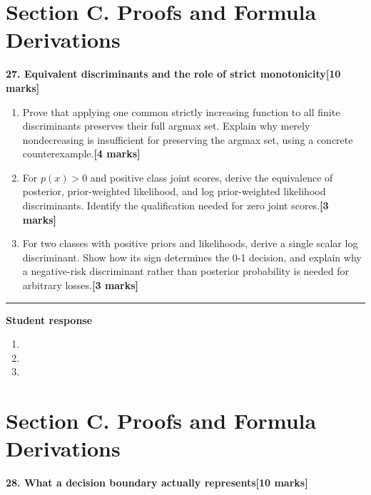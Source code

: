 \documentclass[11pt,a4paper]{article}
\newlength{\BlankAnswerHeight}\setlength{\BlankAnswerHeight}{16mm}
\newcommand{\AnswerBlank}{\leavevmode\par\vspace{\BlankAnswerHeight}}
\begin{document}
\newpage\section*{Section C. Proofs and Formula Derivations}
\textbf{27. Equivalent discriminants and the role of strict monotonicity}\hfill\textbf{[10 marks]}\par\medskip
\begin{enumerate}[label=(\alph*),leftmargin=8mm,itemsep=3pt]
\item Prove that applying one common strictly increasing function to all finite discriminants preserves their full argmax set. Explain why merely nondecreasing is insufficient for preserving the argmax set, using a concrete counterexample.\hfill\textbf{[4 marks]}
\item For \(p(x)>0\) and positive class joint scores, derive the equivalence of posterior, prior-weighted likelihood, and log prior-weighted likelihood discriminants. Identify the qualification needed for zero joint scores.\hfill\textbf{[3 marks]}
\item For two classes with positive priors and likelihoods, derive a single scalar log discriminant. Show how its sign determines the 0-1 decision, and explain why a negative-risk discriminant rather than posterior probability is needed for arbitrary losses.\hfill\textbf{[3 marks]}
\end{enumerate}\par\medskip\hrule\medskip\textbf{Student response}\par
\begin{enumerate}[label=(\alph*),leftmargin=8mm,itemsep=3pt]
\item
\AnswerBlank
\item
\AnswerBlank
\item
\AnswerBlank
\end{enumerate}
\newpage\section*{Section C. Proofs and Formula Derivations}
\textbf{28. What a decision boundary actually represents}\hfill\textbf{[10 marks]}\par\medskip
\end{document}
